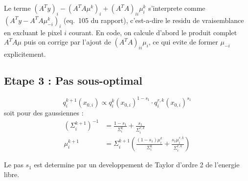 \documentclass[12pt]{article}
\newcommand{\rapport}[1]{\textcolor{codeblue}{\textbf{[Rapport~eq.~#1]}}}
\begin{document}
\begin{remarkbox}
Le terme $(A^Ty)_i - (A^TA\mu^k)_i + (A^TA)_{ii}\mu_i^k$ s'interprete comme $(A^Ty - A^TA\mu^k_{-i})_i$ (eq.~105 du rapport), c'est-a-dire le residu de vraisemblance en excluant le pixel $i$ courant. En code, on calcule d'abord le produit complet $A^TA\mu$ puis on corrige par l'ajout de $(A^TA)_{ii}\mu_i$, ce qui evite de former $\mu_{-i}$ explicitement.
\end{remarkbox}

\subsection{Etape 3 : Pas sous-optimal}

\begin{resultbox}[Mise a jour multiplicative EMG (cas $s_2 = 0$) \rapport{77}]
\begin{equation}
  q_i^{k+1}(x_{0,i}) \propto q_i^k(x_{0,i})^{1-s_1} \cdot q_i^{r,k}(x_{0,i})^{s_1} \label{eq:maj_multi}
\end{equation}
soit pour des gaussiennes :
\begin{align}
  (\Sigma_i^{k+1})^{-1} &= \frac{1-s_1}{\Sigma_i^k} + \frac{s_1}{\Sigma_i^{r,k}} \label{eq:Sigma_update}\\
  \mu_i^{k+1} &= \Sigma_i^{k+1}\left(\frac{(1-s_1)\mu_i^k}{\Sigma_i^k} + \frac{s_1 \mu_i^{r,k}}{\Sigma_i^{r,k}}\right) \label{eq:mu_update}
\end{align}
\end{resultbox}

\noindent Le pas $s_1$ est determine par un developpement de Taylor d'ordre 2 de l'energie libre.
\end{document}
